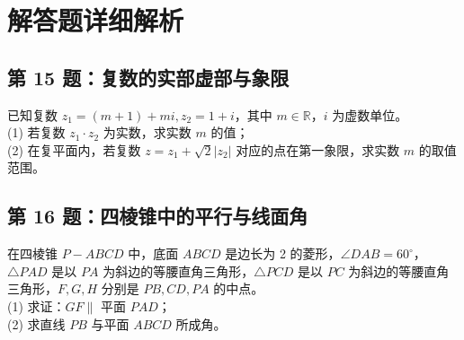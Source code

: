 \documentclass[11pt,a4paper]{ctexart}
\begin{document}

\section{解答题详细解析}

\subsection*{第 15 题：复数的实部虚部与象限}
已知复数 \(z_1=(m+1)+mi, z_2=1+i\)，其中 \(m \in \mathbb{R}\)，\(i\) 为虚数单位。\\
(1) 若复数 \(z_1 \cdot z_2\) 为实数，求实数 \(m\) 的值；\\
(2) 在复平面内，若复数 \(z=z_1+\sqrt{2}|z_2|\) 对应的点在第一象限，求实数 \(m\) 的取值范围。





\subsection*{第 16 题：四棱锥中的平行与线面角}
在四棱锥 \(P-ABCD\) 中，底面 \(ABCD\) 是边长为 2 的菱形，\(\angle DAB=60^\circ\)，\(\triangle PAD\) 是以 \(PA\) 为斜边的等腰直角三角形，\(\triangle PCD\) 是以 \(PC\) 为斜边的等腰直角三角形，\(F, G, H\) 分别是 \(PB, CD, PA\) 的中点。\\
(1) 求证：\(GF \parallel\) 平面 \(PAD\)；\\
(2) 求直线 \(PB\) 与平面 \(ABCD\) 所成角。
\end{document}
